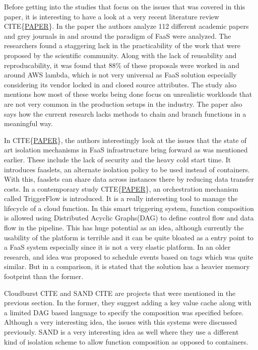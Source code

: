 \documentclass[12pt,titlepage]{article}
\begin{document}
Before getting into the studies that focus on the issues that was covered in
this paper, it is interesting to have a look at  a very recent literature review
CITE\{\href{https://arxiv.org/pdf/2004.03276.pdf}{PAPER}\}. In the paper the authors analyze 112 different academic papers
and grey journals in
and around the paradigm of FaaS were analyzed. The researchers found a
staggering lack in the practicability of the work that were proposed by the
scientific community. Along with the lack of reusability and reproducability, it
was found that 88\% of these proposals were worked in and around AWS lambda,
which is not very universal as FaaS solution especially considering its vendor
locked in and closed source attributes. The study also mentions how most of
these works being done focus on unrealistic workloads that are not very common
in the production setups in the industry. The paper also says how the current
research lacks methods to chain and branch functions in a meaningful way.

In CITE\{\href{https://arxiv.org/abs/2002.09344}{PAPER}\}, the authors interestingly look at the issues that the state of art
isolation mechanisms in FaaS infrastructure bring forward as was mentioned
earlier. These include the lack of security and the heavy cold start time. It
introduces faaslets, an alternate isolation policy to be used instead of
containers. With this, faaslets can share data across instances there by
reducing data transfer costs. In a contemporary study CITE\{\href{https://arxiv.org/pdf/2006.08654.pdf}{PAPER}\}, an
orchestration mechanism called TriggerFlow is introduced. It is a really
interesting tool to manage the lifecycle of a cloud function. In this smart
triggering system, function composition is allowed using Distributed Acyclic
Graphs(DAG) to define control flow and data flow in the pipeline. This has huge
potential as an idea, although currently the usability of the platform is
terrible and it can be quite bloated as a entry point to a FaaS system
especially since it is not a very elastic platform. In an older research, and
idea was proposed to schedule events based on tags which was quite similar. But
in a comparison, it is stated that the solution has a heavier memory footprint
than the former.


Cloudburst CITE and SAND CITE are projects that were mentioned in the previous
section. In the former, they suggest adding a key value cache along with
a limited DAG based language to specify the composition was specified before.
Although a very interesting idea, the issues with this systems were discussed
previously. SAND is a very interesting idea as well where they use a different
kind of isolation scheme to allow function composition as opposed to containers. 
\end{document}
